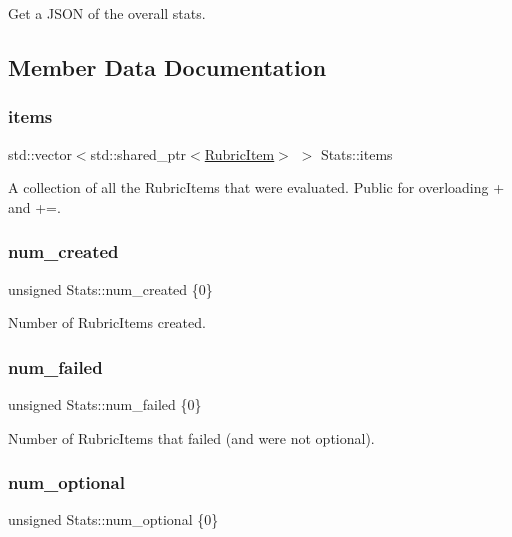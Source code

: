 Get a J\+S\+ON of the overall stats. 

\subsection{Member Data Documentation}
\hypertarget{class_stats_a07121ba8a0b750122d182cbb782b9658}{}\label{class_stats_a07121ba8a0b750122d182cbb782b9658} 
\subsubsection{\texorpdfstring{items}{items}}
{\footnotesize\ttfamily std\+::vector$<$std\+::shared\+\_\+ptr$<$\hyperlink{class_rubric_item}{Rubric\+Item}$>$ $>$ Stats\+::items}

A collection of all the Rubric\+Items that were evaluated. Public for overloading + and +=. \hypertarget{class_stats_aae6907517029159a56582d4050d37ba9}{}\label{class_stats_aae6907517029159a56582d4050d37ba9} 
\subsubsection{\texorpdfstring{num\+\_\+created}{num\_created}}
{\footnotesize\ttfamily unsigned Stats\+::num\+\_\+created \{0\}}

Number of Rubric\+Items created. \hypertarget{class_stats_a157cacc8bc1d42348107d4beb98bb0bf}{}\label{class_stats_a157cacc8bc1d42348107d4beb98bb0bf} 
\subsubsection{\texorpdfstring{num\+\_\+failed}{num\_failed}}
{\footnotesize\ttfamily unsigned Stats\+::num\+\_\+failed \{0\}}

Number of Rubric\+Items that failed (and were not optional). \hypertarget{class_stats_acc4c8dfff62e73a45c3002f7083f9d3d}{}\label{class_stats_acc4c8dfff62e73a45c3002f7083f9d3d} 
\subsubsection{\texorpdfstring{num\+\_\+optional}{num\_optional}}
{\footnotesize\ttfamily unsigned Stats\+::num\+\_\+optional \{0\}}

